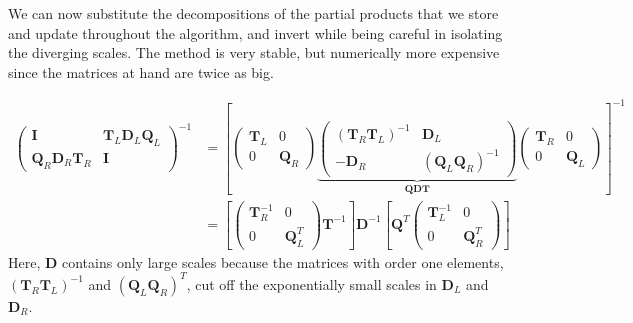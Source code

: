 We can now substitute the decompositions of the partial products that we store and update throughout the algorithm, and invert while being careful in isolating the diverging scales.
The method is very stable, but numerically more expensive since the matrices at hand are twice as big.

\begin{equation}
\begin{split}
\begin{pmatrix}
\bm I & \bm T_L \bm D_L \bm Q_L \\
\bm Q_R \bm D_R \bm T_R & \bm I
\end{pmatrix}^{-1}
&= \left[
\begin{pmatrix}
\bm T_L & 0 \\
0 & \bm Q_R 
\end{pmatrix}
\underbrace{\begin{pmatrix}
(\bm T_R \bm T_L)^{-1} & \bm D_L \\
- \bm D_R & (\bm Q_L \bm Q_R)^{-1}
\end{pmatrix}}_{\bm Q \bm D \bm T}
\begin{pmatrix}
\bm T_R & 0 \\
0 & \bm Q_L
\end{pmatrix}
\right]^{-1} \\
&= \left[
\begin{pmatrix}
\bm T_R^{-1} & 0 \\
0 & \bm Q_L^T
\end{pmatrix}
\bm T^{-1} \right]
\bm D^{-1}
\left[
\bm Q^T
\begin{pmatrix}
\bm T_L^{-1} & 0 \\
0 & \bm Q_R^T
\end{pmatrix}
\right]
\end{split}
\end{equation}
Here, $\bm D$ contains only large scales because the matrices with order one elements, $(\bm T_R \bm T_L)^{-1}$ and $(\bm Q_L \bm Q_R)^T$, cut off the exponentially small scales in $\bm D_L$ and $\bm D_R$.